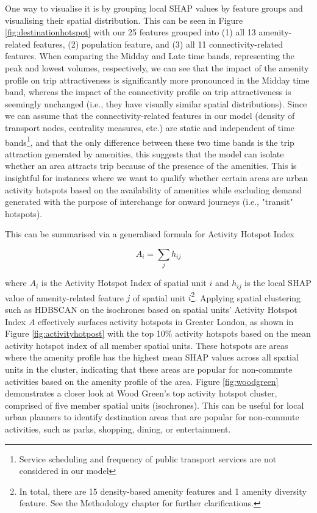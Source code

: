 One way to visualise it is by grouping local SHAP values by feature groups and visualising their spatial distribution. This can be seen in Figure \ref{fig:destinationhotspot} with our 25 features grouped into (1) all 13 amenity-related features, (2) population feature, and (3) all 11 connectivity-related features. When comparing the Midday and Late time bands, representing the peak and lowest volumes, respectively, we can see that the impact of the amenity profile on trip attractiveness is significantly more pronounced in the Midday time band, whereas the impact of the connectivity profile on trip attractiveness is seemingly unchanged (i.e., they have visually similar spatial distributions). Since we can assume that the connectivity-related features in our model (density of transport nodes, centrality measures, etc.) are static and independent of time bands\footnote{Service scheduling and frequency of public transport services are not considered in our model}, and that the only difference between these two time bands is the trip attraction generated by amenities, this suggests that the model can isolate whether an area attracts trip because of the presence of the amenities. This is insightful for instances where we want to qualify whether certain areas are urban activity hotspots based on the availability of amenities while excluding demand generated with the purpose of interchange for onward journeys (i.e., "transit" hotspots). 

\pagebreak
\noindent This can be summarised via a generalised formula for Activity Hotspot Index

$$A_i = \sum_{j} h_{ij}$$

\noindent where $A_i$ is the Activity Hotspot Index of spatial unit $i$ and $h_{ij}$ is the local SHAP value of amenity-related feature $j$ of spatial unit $i$\footnote{In total, there are 15 density-based amenity features and 1 amenity diversity feature. See the Methodology chapter for further clarifications.}. Applying spatial clustering such as HDBSCAN on the isochrones based on spatial units' Activity Hotspot Index $A$ effectively surfaces activity hotspots in Greater London, as shown in Figure \ref{fig:activityhotpost} with the top 10\% activity hotspots based on the mean activity hotspot index of all member spatial units. These hotspots are areas where the amenity profile has the highest mean SHAP values across all spatial units in the cluster, indicating that these areas are popular for non-commute activities based on the amenity profile of the area. Figure \ref{fig:woodgreen} demonstrates a closer look at Wood Green's top activity hotspot cluster, comprised of five member spatial units (isochrones). This can be useful for local urban planners to identify destination areas that are popular for non-commute activities, such as parks, shopping, dining, or entertainment.

